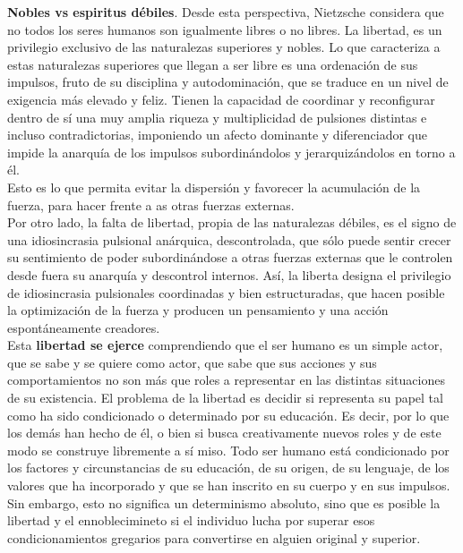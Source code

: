 \documentclass[a4paper, 10pt, twocolumn, spanish]{article}
\begin{document}
\textbf{Nobles vs espiritus débiles}. Desde esta perspectiva, Nietzsche
considera que no todos los seres humanos son igualmente libres o no
libres. La libertad, es un privilegio exclusivo de las naturalezas
superiores y nobles. Lo que caracteriza a estas naturalezas superiores
que llegan a ser libre es una ordenación de sus impulsos, fruto de su
disciplina y autodominación, que se traduce en un nivel de exigencia
más elevado y feliz. Tienen la capacidad de coordinar y reconfigurar
dentro de sí una muy amplia riqueza y multiplicidad de pulsiones
distintas e incluso contradictorias, imponiendo un afecto dominante y
diferenciador que impide la anarquía de los impulsos subordinándolos y
jerarquizándolos en torno a él.\\[0pt]
Esto es lo que permita evitar la dispersión y favorecer la acumulación
de la fuerza, para hacer frente a as otras fuerzas externas.\\[0pt]

Por otro lado, la falta de libertad, propia de las naturalezas
débiles, es el signo de una idiosincrasia pulsional anárquica,
descontrolada, que sólo puede sentir crecer su sentimiento de poder
subordinándose a otras fuerzas externas que le controlen desde fuera
su anarquía y descontrol internos. Así, la liberta designa el
privilegio de idiosincrasia pulsionales coordinadas y bien
estructuradas, que hacen posible la optimización de la fuerza y
producen un pensamiento y una acción espontáneamente creadores.\\[0pt]

Esta \textbf{libertad se ejerce} comprendiendo que el ser humano es un simple
actor, que se sabe y se quiere como actor, que sabe que sus acciones y
sus comportamientos no son más que roles a representar en las
distintas situaciones de su existencia. El problema de la libertad es
decidir si representa su papel tal como ha sido condicionado o
determinado por su educación. Es decir, por lo que los demás han hecho
de él, o bien si busca creativamente nuevos roles y de este modo se
construye libremente a sí miso. Todo ser humano está condicionado por
los factores y circunstancias de su educación, de su origen, de su
lenguaje, de los valores que ha incorporado y que se han inscrito en
su cuerpo y en sus impulsos. Sin embargo, esto no significa un
determinismo absoluto, sino que es posible la libertad y el
ennoblecimineto si el individuo lucha por superar esos
condicionamientos gregarios para convertirse en alguien original y
superior.\\[0pt]
\end{document}
